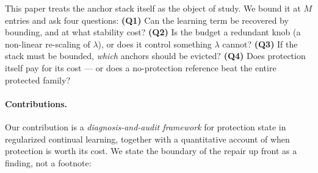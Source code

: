\documentclass[review,12pt,number]{elsarticle}
\begin{document}
This paper treats the anchor stack itself as the object of study.
We bound it at $M$ entries and ask four questions:
\textbf{(Q1)} Can the learning term be recovered by bounding, and at
what stability cost?
\textbf{(Q2)} Is the budget a redundant knob (a non-linear re-scaling
of $\lambda$), or does it control something $\lambda$ cannot?
\textbf{(Q3)} If the stack must be bounded, \emph{which} anchors should
be evicted?
\textbf{(Q4)} Does protection itself pay for its cost --- or does a
no-protection reference beat the entire protected family?

\paragraph{Contributions.}
Our contribution is a \emph{diagnosis-and-audit framework} for
protection state in regularized continual learning, together with a
quantitative account of when protection is worth its cost. We state the
boundary of the repair up front as a finding, not a footnote:
\end{document}
